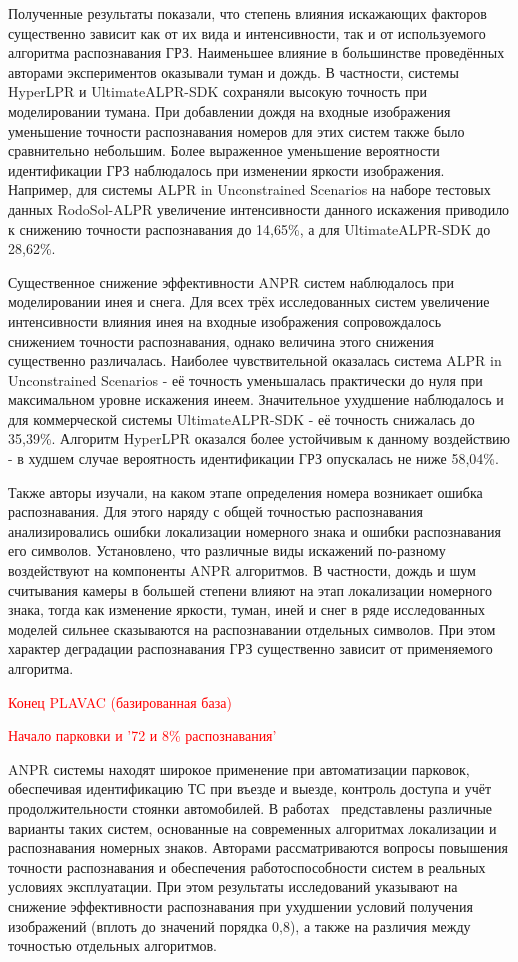 \documentclass[12pt]{article}
\theoremstyle{definition}
\begin{document}
Полученные результаты показали, что степень влияния искажающих факторов существенно зависит как от их вида и интенсивности, так и от используемого алгоритма распознавания ГРЗ. Наименьшее влияние в большинстве проведённых авторами экспериментов оказывали туман и дождь. В частности, системы HyperLPR и UltimateALPR-SDK сохраняли высокую точность при моделировании тумана. При добавлении дождя на входные изображения уменьшение точности распознавания номеров для этих систем также было сравнительно небольшим. Более выраженное уменьшение вероятности идентификации ГРЗ наблюдалось при изменении яркости изображения. Например, для системы ALPR in Unconstrained Scenarios на наборе тестовых данных RodoSol-ALPR увеличение интенсивности данного искажения приводило к снижению точности распознавания до 14,65\%, а для UltimateALPR-SDK до 28,62\%.

Существенное снижение эффективности ANPR систем наблюдалось при моделировании инея и снега. Для всех трёх исследованных систем увеличение интенсивности влияния инея на входные изображения сопровождалось снижением точности распознавания, однако величина этого снижения существенно различалась. Наиболее чувствительной оказалась система ALPR in Unconstrained Scenarios - её точность уменьшалась практически до нуля при максимальном уровне искажения инеем. Значительное ухудшение наблюдалось и для коммерческой системы UltimateALPR-SDK - её точность снижалась до 35,39\%. Алгоритм HyperLPR оказался более устойчивым к данному воздействию - в худшем случае вероятность идентификации ГРЗ опускалась не ниже 58,04\%.

Также авторы изучали, на каком этапе определения номера возникает ошибка распознавания. Для этого наряду с общей точностью распознавания анализировались ошибки локализации номерного знака и ошибки распознавания его символов. Установлено, что различные виды искажений по-разному воздействуют на компоненты ANPR алгоритмов. В частности, дождь и шум считывания камеры в большей степени влияют на этап локализации номерного знака, тогда как изменение яркости, туман, иней и снег в ряде исследованных моделей сильнее сказываются на распознавании отдельных символов. При этом характер деградации распознавания ГРЗ существенно зависит от применяемого алгоритма.

\textcolor{red}{Конец PLAVAC (базированная база)}

\textcolor{red}{Начало парковки и '72 и 8\% распознавания'}

ANPR системы находят широкое применение при автоматизации парковок, обеспечивая идентификацию ТС при въезде и выезде, контроль доступа и учёт продолжительности стоянки автомобилей. В работах~\cite{Kalva2025,Pradhan2025,Ebrahimishadman2026} представлены различные варианты таких систем, основанные на современных алгоритмах локализации и распознавания номерных знаков. Авторами рассматриваются вопросы повышения точности распознавания и обеспечения работоспособности систем в реальных условиях эксплуатации. При этом результаты исследований указывают на снижение эффективности распознавания при ухудшении условий получения изображений (вплоть до значений порядка 0,8), а также на различия между точностью отдельных алгоритмов.
\end{document}
